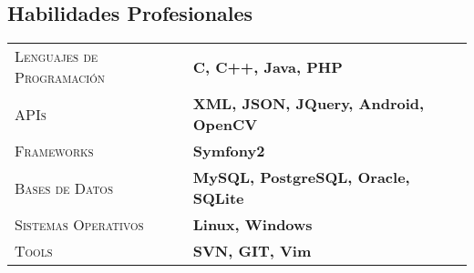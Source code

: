 \documentclass[a4paper, oneside, final]{scrartcl} %
\newcommand{\gray}{\rowcolor[gray]{.90}} %
\newcommand{\cell}{\cellcolor[gray]{.90}} %
\begin{document}
\begin{center}



\section{Habilidades Profesionales}

\begin{tabularx}{0.97\linewidth}{>{\raggedleft\scshape}p{5cm}X}
Lenguajes de Programación & \textbf{ \cell C, C++, Java, PHP} \\
APIs & \textbf{ \cell  XML, JSON, JQuery, Android, OpenCV} \\
Frameworks & \textbf{ \cell  Symfony2} \\
Bases de Datos & \textbf{ \cell  MySQL, PostgreSQL, Oracle, SQLite} \\
Sistemas Operativos & \textbf{\cell  Linux, Windows }\\ 
Tools & \textbf{ \cell SVN, GIT, Vim}
\end{tabularx}


\end{center}
\end{document}
